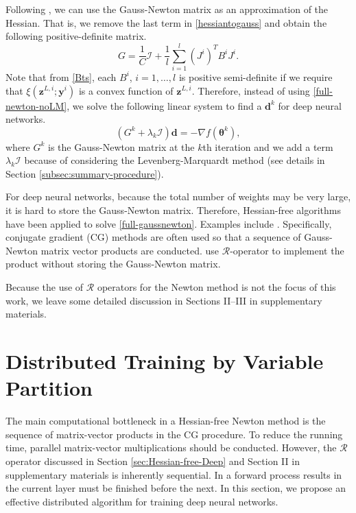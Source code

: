 \documentclass[12pt]{article}
\def\by{{\boldsymbol y}}
\def\bd{{\boldsymbol d}}
\def\bz{{\boldsymbol z}}
\def\btheta{\boldsymbol \theta}
\begin{document}
Following \cite{NNS02a}, we can use the Gauss-Newton matrix as 
an approximation of the Hessian. That is, we remove the last term in \eqref{hessiantogauss} and obtain the following positive-definite matrix.
\begin{equation}
\label{def-gauss-newton}
G = \frac{1}{C} \mathcal I + \frac{1}{l}\sum_{i=1}^l (J^i)^T B^i J^i. 
\end{equation}
Note that from \eqref{Bts}, each $B^i$, $i=1,\ldots,l$ is positive semi-definite if we require that $\xi(\bz^{L,i};\by^i)$ is a convex function of $\bz^{L,i}$.
Therefore, instead of using \eqref{full-newton-noLM}, we solve the following linear system to find a $\bd^k$ for deep neural networks.
\begin{equation}
\label{full-gaussnewton}
(G^k  + \lambda_k \mathcal I) \bd = - \nabla f(\btheta^k),
\end{equation}
where $G^k$ is the Gauss-Newton matrix at the $k$th iteration and we add a term $\lambda_k \mathcal{I}$ because of considering 
the Levenberg-Marquardt method (see details in Section \ref{subsec:summary-procedure}).
\par For deep neural networks, because the total number of weights may be very large, it is hard to store the Gauss-Newton matrix. 
Therefore, Hessian-free algorithms have been applied to solve \eqref{full-gaussnewton}. 
Examples include \cite{JM10a, JN11a}. Specifically, conjugate gradient (CG) methods 
are often used so that a sequence of Gauss-Newton matrix vector products are conducted. 
\cite{JM10a, CCW15a} use $\mathcal R$-operator \citep{BAP94a} to implement the product without storing the Gauss-Newton matrix.

Because the use of $\mathcal{R}$ operators for the Newton method is not
the focus of this work, we leave some detailed discussion 
in Sections II--III in supplementary materials. 

\section{Distributed Training by Variable Partition} 
\label{sec:Distributed-Deep}
The main computational bottleneck in a Hessian-free Newton method is the sequence of matrix-vector
products in the CG procedure. To reduce the running time, parallel matrix-vector multiplications should be conducted.
However, the $\mathcal R$ operator discussed in Section \ref{sec:Hessian-free-Deep} and Section II in supplementary materials is inherently sequential.
In a forward process results in the current layer must be finished before the next. 
In this section, we propose an effective distributed algorithm for training deep neural networks.
\end{document}
